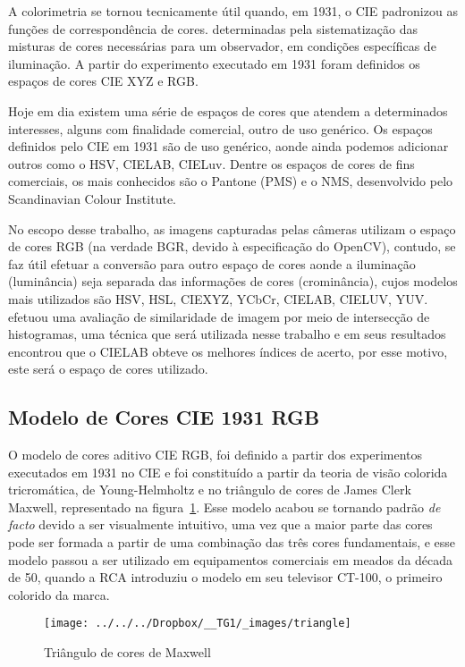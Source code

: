 \documentclass[ecp,tc]{iiufrgs}
\begin{document}
A colorimetria se tornou tecnicamente útil quando, em 1931, o CIE padronizou as funções de correspondência de cores. determinadas pela sistematização das misturas de cores necessárias para um observador, em condições específicas de iluminação. A partir do experimento executado em 1931 foram definidos os espaços de cores CIE XYZ e RGB.

Hoje em dia existem uma série de espaços de cores que atendem a determinados interesses, alguns com finalidade comercial, outro de uso genérico. Os espaços definidos pelo CIE em 1931 são de uso genérico, aonde ainda podemos adicionar outros como o HSV, CIELAB, CIELuv. Dentre os espaços de cores de fins comerciais, os mais conhecidos são o Pantone (PMS) e o NMS, desenvolvido pelo Scandinavian Colour Institute.

No escopo desse trabalho, as imagens capturadas pelas câmeras utilizam o espaço de cores RGB (na verdade BGR, devido à especificação do OpenCV), contudo, se faz útil efetuar a conversão para outro espaço de cores aonde a iluminação (luminância) seja separada das informações de cores (crominância), cujos modelos mais utilizados são HSV, HSL, CIEXYZ, YCbCr, CIELAB, CIELUV, YUV.  efetuou uma avaliação de similaridade de imagem por meio de intersecção de histogramas, uma técnica que será utilizada nesse trabalho e em seus resultados encontrou que o CIELAB obteve os melhores índices de acerto, por esse motivo, este será o espaço de cores utilizado.

\subsection{Modelo de Cores CIE 1931 RGB}

O modelo de cores aditivo CIE RGB, foi definido a partir dos experimentos executados em 1931 no CIE e foi constituído a partir da teoria de visão colorida tricromática, de Young-Helmholtz e no triângulo de cores de James Clerk Maxwell, representado na figura~\ref{fig:triangle}. Esse modelo acabou se tornando padrão \textit{de facto} devido a ser visualmente intuitivo, uma vez que a maior parte das cores pode ser formada a partir de uma combinação das três cores fundamentais, e esse modelo passou a ser utilizado em equipamentos comerciais em meados da década de 50, quando a RCA introduziu o modelo em seu televisor CT-100, o primeiro colorido da marca.

\begin{figure}
	\centering
	\caption{Triângulo de cores de Maxwell}
	\texttt{[image: ../../../Dropbox/\_\_TG1/\_images/triangle]}
	\label{fig:triangle}
\end{figure}
\end{document}
